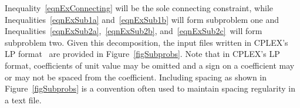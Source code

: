 \documentclass[11pt]{article} %
\begin{document}
Inequality~\ref{eqnExConnecting} will be the sole connecting constraint, while Inequalities~\ref{eqnExSub1a} and~\ref{eqnExSub1b} will form subproblem one and Inequalities~\ref{eqnExSub2a},~\ref{eqnExSub2b}, and~\ref{eqnExSub2c}~will form subproblem two.  Given this decomposition, the input files written in CPLEX's LP format~\cite{cplexmanual} are provided in Figure~\ref{figSubprobs}.  Note that in CPLEX's LP format, coefficients of unit value may be omitted and a sign on a coefficient may or may not be spaced from the coefficient.  Including spacing as shown in Figure~\ref{figSubprobs} is a convention often used to maintain spacing regularity in a text file.
%
%
% 
%
% 
%
\end{document}
